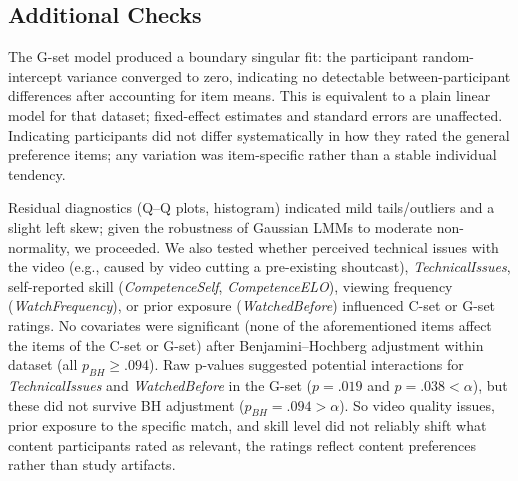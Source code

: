 \subsection{Additional Checks}
\label{subsec:additional-checks}
The G-set model produced a boundary singular fit: the participant random-intercept variance converged to zero, indicating no detectable between-participant differences after accounting for item means. This is equivalent to a plain linear model for that dataset; fixed-effect estimates and standard errors are unaffected. Indicating participants did not differ systematically in how they rated the general preference items; any variation was item-specific rather than a stable individual tendency.

Residual diagnostics (Q--Q plots, histogram) indicated mild tails/outliers and a slight left skew; given the robustness of Gaussian LMMs to moderate non-normality, we proceeded.
We also tested whether perceived technical issues with the video (e.g., caused by video cutting a pre-existing shoutcast), \textit{TechnicalIssues}, self-reported skill (\textit{CompetenceSelf}, \textit{CompetenceELO}), viewing frequency (\textit{WatchFrequency}), or prior exposure (\textit{WatchedBefore}) influenced C-set or G-set ratings. No covariates were significant (none of the aforementioned items affect the items of the C-set or G-set) after Benjamini--Hochberg adjustment within dataset (all $p_{BH} \ge .094$). Raw p-values suggested potential interactions for \textit{TechnicalIssues} and \textit{WatchedBefore} in the G-set ($p = .019$ and $p = .038 < \alpha$), but these did not survive BH adjustment ($p_{BH} = .094 > \alpha$). So video quality issues, prior exposure to the specific match, and skill level did not reliably shift what content participants rated as relevant, the ratings reflect content preferences rather than study artifacts.

